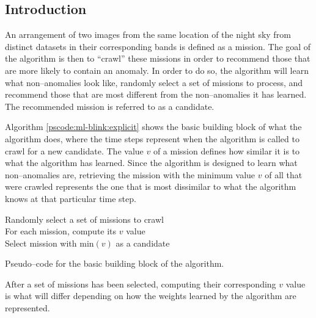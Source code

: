 \subsection{Introduction} \label{subsect:meth:intro}

An arrangement of two images from the same location of the night sky from distinct datasets in their corresponding bands is defined as a mission. The goal of the \mlblink algorithm is then to ``crawl'' these missions in order to recommend those that are more likely to contain an anomaly. In order to do so, the \mlblink algorithm will learn what non--anomalies look like, randomly select a set of missions to process, and recommend those that are most different from the non--anomalies it has learned. The recommended mission is referred to as a candidate.

Algorithm \ref{pscode:ml-blink:explicit} shows the basic building block of what the \mlblink algorithm does, where the time steps represent when the algorithm is called to crawl for a new candidate. The value $v$ of a mission defines how similar it is to what the \mlblink algorithm has learned. Since the \mlblink algorithm is designed to learn what non--anomalies are, retrieving the mission with the minimum value $v$ of all that were crawled represents the one that is most dissimilar to what the \mlblink algorithm knows at that particular time step.

\vspace{0.4cm}
\begin{algorithm}[H]
    \SetAlgoLined
        \FMain{} {
             {
                Randomly select a set of missions to crawl \\
                For each mission, compute its $v$ value \\
                Select mission with $\text{min}(v)$ as a candidate \\
            }
        }
    \caption{Pseudo--code for the basic building block of the \mlblink algorithm.}
    \label{pscode:ml-blink:explicit}
\end{algorithm}
\vspace{0.4cm}

After a set of missions has been selected, computing their corresponding $v$ value is what will differ depending on how the weights learned by the algorithm are represented.